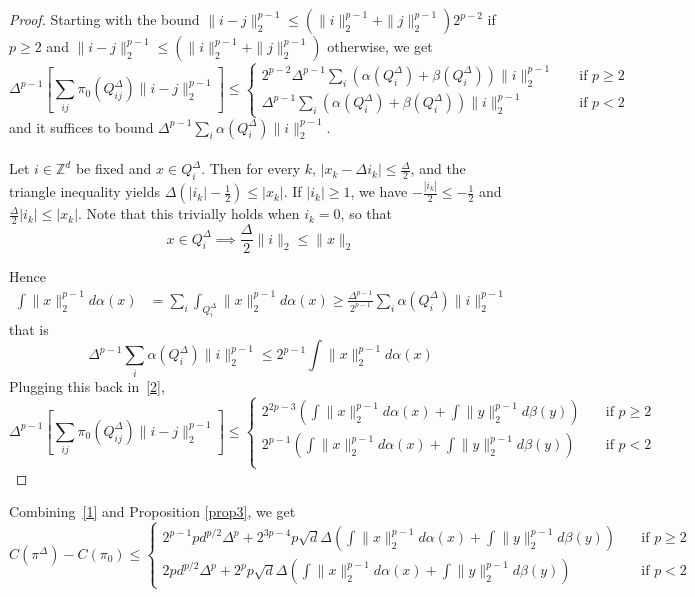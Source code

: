 \documentclass[12pt]{report}
\theoremstyle{definition}
\theoremstyle{remark}
\begin{document}
\begin{proof}
	Starting with the bound $\|i-j\|_2^{p-1}\leq  (\|i\|_2^{p-1}+\|j\|_2^{p-1})2^{p-2}$ if $p\geq 2$ and $\|i-j\|_2^{p-1}\leq  (\|i\|_2^{p-1}+\|j\|_2^{p-1})$ otherwise,
we get 
\begin{equation*}\Delta^{p-1} \left[\sum_{ij} \pi_0(Q_{ij}^{\Delta}) \|i-j\|_2^{p-1} \right]\leq 
\begin{cases}
2^{p-2}\Delta^{p-1}\sum_{i} \left(\alpha(Q_i^\Delta)+\beta(Q_i^\Delta)\right)\|i\|_2^{p-1} \quad &\text{if } p\geq 2\\
\Delta^{p-1}\sum_{i} \left(\alpha(Q_i^\Delta)+\beta(Q_i^\Delta)\right)\|i\|_2^{p-1} \quad &\text{if } p< 2
\end{cases}
\tag{2} \label{2}
\end{equation*}
and it suffices to bound $\Delta^{p-1} \sum_{i} \alpha(Q_i^\Delta)\|i\|_2^{p-1}$.\\
\\
Let $i\in \mathbb Z^d$ be fixed and $x\in Q_i^\Delta$. Then for every $k$, $|x_k-\Delta i_k|\leq \frac \Delta2$, and the triangle inequality yields $\Delta\left(|i_k|-\frac 12\right)\leq |x_k|$. If $|i_k|\geq 1$, we have $-\frac{|i_k|}{2}\leq -\frac 12$ and $\frac{\Delta}{2} |i_k|\leq |x_k|$. Note that this trivially holds when $i_k=0$, so that $$x\in Q_i^\Delta \implies \frac \Delta 2 \|i\|_2 \leq \|x\|_2$$

\noindent Hence 
$$\begin{aligned}
\int \|x\|_2^{p-1}d\alpha(x) &= \sum_i \int_{Q_i^\Delta} \|x\|_2^{p-1}d\alpha(x) 
\geq \frac{\Delta^{p-1}}{2^{p-1}}\sum_{i} \alpha(Q_i^\Delta) \|i\|_2^{p-1}
\end{aligned}$$
that is 
$$
\Delta^{p-1}\sum_{i} \alpha(Q_i^\Delta) \|i\|_2^{p-1} \leq 2^{p-1} \int \|x\|_2^{p-1}d\alpha(x)
$$
Plugging this back in~\eqref{2}, 
$$\Delta^{p-1} \left[\sum_{ij} \pi_0(Q_{ij}^{\Delta}) \|i-j\|_2^{p-1} \right]\leq
\begin{cases}
2^{2p-3} \left(\int \|x\|_2^{p-1}d\alpha(x)+ \int \|y\|_2^{p-1}d\beta(y)\right) \quad &\text{if } p\geq 2 \\
2^{p-1} \left(\int \|x\|_2^{p-1}d\alpha(x)+ \int \|y\|_2^{p-1}d\beta(y)\right) \quad &\text{if } p< 2 \\
\end{cases}
$$
\end{proof}

Combining~\eqref{1} and Proposition \ref{prop3}, we get
\begin{equation*}
C(\pi^{\Delta})-C(\pi_{0})\leq 
\begin{cases}
2^{p-1}pd^{p/2}\Delta^p + 2^{3p-4}p \sqrt d \Delta \left(\int \|x\|_2^{p-1}d\alpha(x)+ \int \|y\|_2^{p-1}d\beta(y)\right) \quad &\text{if } p\geq 2 \\
2pd^{p/2}\Delta^p + 2^{p}p \sqrt d \Delta \left(\int \|x\|_2^{p-1}d\alpha(x)+ \int \|y\|_2^{p-1}d\beta(y)\right) \quad &\text{if } p< 2 \tag{3} \label{3}
\end{cases}
\end{equation*}
\end{document}
